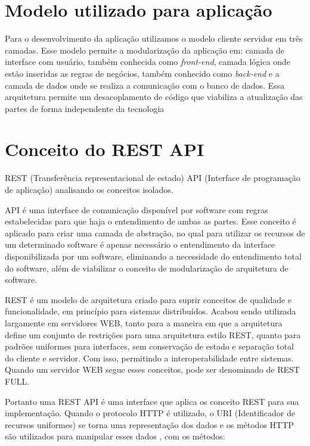 \documentclass[../../layout.tex]{subfiles}
\begin{document}
\section{Modelo utilizado para aplicação}
\hspace*{3em}Para o desenvolvimento da aplicação utilizamos o modelo cliente servidor em três camadas. Esse modelo permite a modularização da aplicação em: camada de interface com usuário, também conhecida como \emph{front-end}, camada lógica onde estão inseridas as regras de negócios, também conhecido como \emph{back-end} e a camada de dados  onde se realiza a comunicação com o banco de dados. Essa arquitetura permite um desacoplamento de código que viabiliza a atualização das partes de forma independente da tecnologia \cite{3layers}
\section{Conceito do REST API}
\hspace*{3em}REST (Transferência representacional de estado) API (Interface de programação de aplicação) analisando os conceitos isolados.\par
API é uma interface de comunicação  disponível por software com regras estabelecidas para que haja o entendimento de ambas as partes. Esse conceito é aplicado para criar uma camada de abstração, no qual para utilizar os recursos de um determinado software é apenas necessário o entendimento da interface disponibilizada por um software, eliminando a  necessidade do entendimento total do software, além de viabilizar o conceito de modularização de arquitetura de software. \cite{16} \par 
REST é um modelo de arquitetura criado para suprir conceitos de qualidade e funcionalidade, em princípio para sistemas distribuídos. Acabou sendo utilizada largamente em servidores WEB, tanto para a maneira em que a arquitetura define um conjunto de restrições para uma arquitetura estilo REST, quanto para padrões uniformes para interfaces, sem conservação de estado e separação total do cliente e servidor. Com isso, permitindo a interoperabilidade entre sistemas. Quando um servidor WEB segue esses conceitos, pode ser denominado de REST FULL.\par

Portanto uma REST API é uma interface que aplica os conceito REST para sua implementação\cite{19}. Quando o protocolo HTTP é utilizado, o URI (Identificador de recursos uniformes) se torna uma representação dos dados e os métodos HTTP são utilizados para manipular esses dados \cite{16}, com os métodos:
\end{document}
